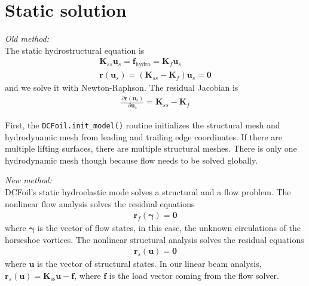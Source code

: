 \documentclass[10pt]{article}
\newcommand{\pp}[2]{\frac{\partial #1}{\partial #2}}
\newcommand{\mbf}[1]{\mathbf{#1}}
\newcommand{\mbs}[1]{\boldsymbol{#1}}
\newcommand{\be}{\begin{eqnarray}}
\newcommand{\ee}{\end{eqnarray}}
\newcommand{\beq}{\begin{equation}\begin{aligned}}
\newcommand{\eeq}{\end{aligned}\end{equation}}
\newcommand{\Uinf}{U_{\infty}}
\newcommand{\tn}[1]{\textrm{#1}}
\begin{document}

\section{Static solution}

\emph{Old method:}\\
The static hydrostructural equation is
\be
\mbf{K}_{ss} \mbf{u}_s   = \mbf{f}_{\tn{hydro}} = \mbf{K}_f \mbf{u}_s
\\
\mbf{r}(\mbf{u}_s) = \left(\mbf{K}_{ss} - \mbf{K}_f\right)\mbf{u}_s  = \mbf{0}
\ee
and we solve it with Newton-Raphson.
The residual Jacobian is
\be
\pp{\mbf{r}(\mbf{u}_s)}{\mbf{u}_s}
=
\mbf{K}_{ss} - \mbf{K}_{f}
\ee

First, the \texttt{DCFoil.init\_model()} routine initializes the structural mesh and hydrodynamic mesh from leading and trailing edge coordinates.
If there are multiple lifting surfaces, there are multiple structural meshes.
There is only one hydrodynamic mesh though because flow needs to be solved globally.

\emph{New method:}\\
DCFoil's static hydroelastic mode solves a structural and a flow problem.
The nonlinear flow analysis solves the residual equations
\beq
\mbf{r}_f(\mbs{\gamma}) = \mbf{0}
\eeq
where $\mbs{\gamma}$ is the vector of flow states, in this case, the unknown circulations of the horseshoe vortices.
The nonlinear structural analysis solves the residual equations
\beq
\mbf{r}_s(\mbf{u}) = \mbf{0}
\eeq
where $\mbf{u}$ is the vector of structural states.
In our linear beam analysis, $\mbf{r}_s(\mbf{u}) = \mbf{K}_\tn{ss} \mbf{u} - \mbf{f}$, where $\mbf{f}$ is the load vector coming from the flow solver.
\end{document}
